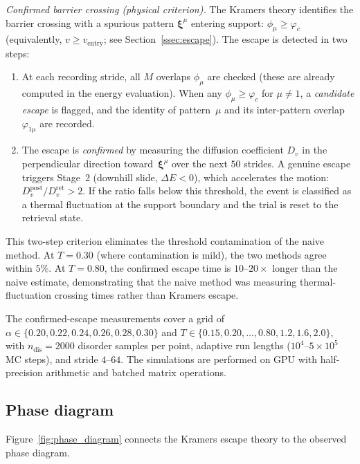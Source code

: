 \documentclass[11pt]{article}
\newcommand{\bxi}{\boldsymbol{\xi}}
\begin{document}
\emph{Confirmed barrier crossing (physical criterion).}
The Kramers theory identifies the barrier crossing with a spurious pattern $\bxi^\mu$ entering support: $\phi_\mu \geq \varphi_c$ (equivalently, $v \geq v_{\mathrm{entry}}$; see Section~\ref{ssec:escape}).  The escape is detected in two steps:
\begin{enumerate}
\item At each recording stride, all $M$ overlaps $\phi_\mu$ are checked (these are already computed in the energy evaluation).  When any $\phi_\mu \geq \varphi_c$ for $\mu \neq 1$, a \emph{candidate escape} is flagged, and the identity of pattern~$\mu$ and its inter-pattern overlap $\varphi_{1\mu}$ are recorded.
\item The escape is \emph{confirmed} by measuring the diffusion coefficient $D_v$ in the perpendicular direction toward~$\bxi^\mu$ over the next $50$ strides.  A genuine escape triggers Stage~2 (downhill slide, $\Delta E < 0$), which accelerates the motion: $D_v^{\mathrm{post}} / D_v^{\mathrm{ret}} > 2$.  If the ratio falls below this threshold, the event is classified as a thermal fluctuation at the support boundary and the trial is reset to the retrieval state.
\end{enumerate}
This two-step criterion eliminates the threshold contamination of the naive method.  At $T = 0.30$ (where contamination is mild), the two methods agree within $5\%$.  At $T = 0.80$, the confirmed escape time is $10$--$20\times$ longer than the naive estimate, demonstrating that the naive method was measuring thermal-fluctuation crossing times rather than Kramers escape.

The confirmed-escape measurements cover a grid of $\alpha \in \{0.20, 0.22, 0.24, 0.26, 0.28, 0.30\}$ and $T \in \{0.15, 0.20, \ldots, 0.80, 1.2, 1.6, 2.0\}$, with $n_{\mathrm{dis}} = 2000$ disorder samples per point, adaptive run lengths ($10^4$--$5 \times 10^5$ MC steps), and stride $4$--$64$.  The simulations are performed on GPU with half-precision arithmetic and batched matrix operations.

\subsection{Phase diagram}
\label{ssec:phase_diagram}

Figure~\ref{fig:phase_diagram} connects the Kramers escape theory to the observed phase diagram.
\end{document}
